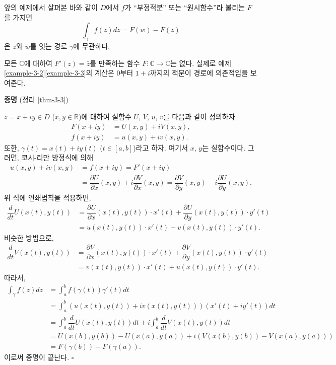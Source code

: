 앞의 예제에서 살펴본 바와 같이 
$D$에서 $f$가 ``부정적분'' 또는 ``원시함수''라 불리는 $F$를 가지면
\[
\int_\gamma f(z)dz = F(w) - F(z)
\]
은 $z$와 $w$를 잇는 경로 $\gamma$에 무관하다.

\begin{saltexample}[label=example-3-6]{}{}
모든 $\mathbb C$에 대하여 
$F'(z) = \bar z$를 만족하는 함수 $F:\mathbb C \to \mathbb C$는 없다.
실제로 예제 \ref{example-3-2}\와 \ref{example-3-3}의 계산은
$0$부터 $1+i$까지의 적분이 경로에 의존적임을 보여준다.
\end{saltexample}


{\bf 증명} (정리 \ref{thm-3-3})

$z = x+iy\in D$ ($x,y\in \mathbb R$)에 대하여
실함수 $U$, $V$, $u$, $v$를 다음과 같이 정의하자.
\begin{align*}
F(x+iy) &= U(x,y) + iV(x,y), \\
f(x+iy) &= u(x,y) + iv(x,y).
\end{align*}
또한, $\gamma(t) = x(t) + iy(t)$ ($t\in[a,b]$)라고 하자.
여기서 $x$, $y$는 실함수이다.
그러면, 코시-리만 방정식에 의해
\begin{align*}
u(x,y) + iv(x,y) 
&= f(x+iy) = F'(x+iy) \\
&= \dfrac{\partial U}{\partial x}(x,y) + i \dfrac{\partial V}{\partial x}(x,y)
= \dfrac{\partial V}{\partial y}(x,y) - i \dfrac{\partial U}{\partial y}(x,y).
\end{align*}
위 식에 연쇄법칙을 적용하면,
\begin{align*}
\dfrac d{dt} U(x(t), y(t))
&= \dfrac{\partial U}{\partial x}(x(t),y(t))\cdot x'(t)
 + \dfrac{\partial U}{\partial y}(x(t),y(t))\cdot y'(t) \\
&= u(x(t),y(t))\cdot x'(t) - v(x(t),y(t))\cdot y'(t).
\end{align*}
비슷한 방법으로,
\begin{align*}
\dfrac d{dt} V(x(t), y(t))
&= \dfrac{\partial V}{\partial x}(x(t),y(t))\cdot x'(t)
 + \dfrac{\partial V}{\partial y}(x(t),y(t))\cdot y'(t) \\
&= v(x(t),y(t))\cdot x'(t) + u(x(t),y(t))\cdot y'(t).
\end{align*}
따라서,
\begin{align*}
\int_\gamma f(z)dz
&= \int_a^b f(\gamma(t))\gamma'(t)dt \\
&= \int_a^b \left( u(x(t), y(t)) + iv(x(t),y(t)) \right) (x'(t)+iy'(t))dt \\
&= \int_a^b \dfrac d{dt} U(x(t), y(t))dt + i \int_a^b \dfrac d{dt} V(x(t), y(t))dt \\
&= U(x(b), y(b)) - U(x(a), y(a)) + 
i\left( V(x(b), y(b)) - V(x(a), y(a)) \right) \\
&= F(\gamma(b)) - F(\gamma(a)).
\end{align*}
이로써 증명이 끝난다. \hfill $\square$

